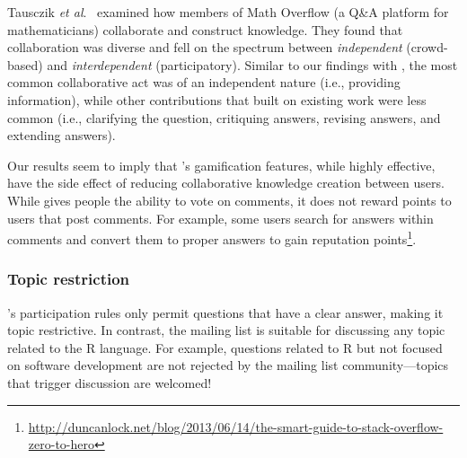 Tausczik \textit{et al}.~\cite{Tausczik2014} examined how members of Math Overflow (a Q\&A platform for mathematicians) collaborate and construct knowledge. They found that collaboration was diverse and fell on the spectrum between \textit{independent} (crowd-based) and \textit{interdependent} (participatory). Similar to our findings with \SO, the most common collaborative act was of an independent nature (i.e., providing information), while other contributions that built on existing work were less common (i.e., clarifying the question, critiquing answers, revising answers, and extending answers).

Our results seem to imply that \SO's gamification features, while highly effective, have the side effect of reducing collaborative knowledge creation between users. While \SO gives people the ability to vote on comments, it does not reward points to users that post comments. For example, some users search \SO for answers within comments and convert them to proper answers to gain reputation points\footnote{\url{http://duncanlock.net/blog/2013/06/14/the-smart-guide-to-stack-overflow-zero-to-hero}}.


\subsubsection{Topic restriction}

\SO's participation rules only permit questions that have a clear answer, making it topic restrictive. In contrast, the \RH mailing list is suitable for discussing
any topic related to the R language. For example, questions related to R but not focused on software development are not rejected by the \RH mailing list community---topics that trigger discussion are welcomed!

